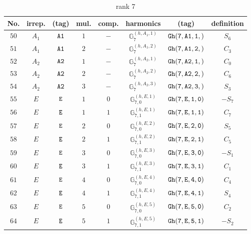 \documentclass[fleqn,8pt]{jsarticle}
\begin{document}
\begin{table}[ht!]
\begin{center}
\caption{rank 7}
\renewcommand{\arraystretch}{1.3}
\begin{tabular}{cccccccc} \hline \hline
No. & irrep. & (tag) & mul. & comp. & harmonics & (tag) & definition \\ \hline
$ 50 $ & $ A_{1} $ & $ {\tt A1} $ & $ 1 $ & $ - $ & $ \mathbb{G}_{7}^{(h,A_{1},1)} $ & $ {\tt Gh(7,A1,1,)} $ & $ S_{6} $ \\
$ 51 $ & $ A_{1} $ & $ {\tt A1} $ & $ 2 $ & $ - $ & $ \mathbb{G}_{7}^{(h,A_{1},2)} $ & $ {\tt Gh(7,A1,2,)} $ & $ C_{3} $ \\
$ 52 $ & $ A_{2} $ & $ {\tt A2} $ & $ 1 $ & $ - $ & $ \mathbb{G}_{7}^{(h,A_{2},1)} $ & $ {\tt Gh(7,A2,1,)} $ & $ C_{0} $ \\
$ 53 $ & $ A_{2} $ & $ {\tt A2} $ & $ 2 $ & $ - $ & $ \mathbb{G}_{7}^{(h,A_{2},2)} $ & $ {\tt Gh(7,A2,2,)} $ & $ C_{6} $ \\
$ 54 $ & $ A_{2} $ & $ {\tt A2} $ & $ 3 $ & $ - $ & $ \mathbb{G}_{7}^{(h,A_{2},3)} $ & $ {\tt Gh(7,A2,3,)} $ & $ S_{3} $ \\
$ 55 $ & $ E $ & $ {\tt E} $ & $ 1 $ & $ 0 $ & $ \mathbb{G}_{7,0}^{(h,E,1)} $ & $ {\tt Gh(7,E,1,0)} $ & $ - S_{7} $ \\
$ 56 $ & $ E $ & $ {\tt E} $ & $ 1 $ & $ 1 $ & $ \mathbb{G}_{7,1}^{(h,E,1)} $ & $ {\tt Gh(7,E,1,1)} $ & $ C_{7} $ \\
$ 57 $ & $ E $ & $ {\tt E} $ & $ 2 $ & $ 0 $ & $ \mathbb{G}_{7,0}^{(h,E,2)} $ & $ {\tt Gh(7,E,2,0)} $ & $ S_{5} $ \\
$ 58 $ & $ E $ & $ {\tt E} $ & $ 2 $ & $ 1 $ & $ \mathbb{G}_{7,1}^{(h,E,2)} $ & $ {\tt Gh(7,E,2,1)} $ & $ C_{5} $ \\
$ 59 $ & $ E $ & $ {\tt E} $ & $ 3 $ & $ 0 $ & $ \mathbb{G}_{7,0}^{(h,E,3)} $ & $ {\tt Gh(7,E,3,0)} $ & $ - S_{1} $ \\
$ 60 $ & $ E $ & $ {\tt E} $ & $ 3 $ & $ 1 $ & $ \mathbb{G}_{7,1}^{(h,E,3)} $ & $ {\tt Gh(7,E,3,1)} $ & $ C_{1} $ \\
$ 61 $ & $ E $ & $ {\tt E} $ & $ 4 $ & $ 0 $ & $ \mathbb{G}_{7,0}^{(h,E,4)} $ & $ {\tt Gh(7,E,4,0)} $ & $ C_{4} $ \\
$ 62 $ & $ E $ & $ {\tt E} $ & $ 4 $ & $ 1 $ & $ \mathbb{G}_{7,1}^{(h,E,4)} $ & $ {\tt Gh(7,E,4,1)} $ & $ S_{4} $ \\
$ 63 $ & $ E $ & $ {\tt E} $ & $ 5 $ & $ 0 $ & $ \mathbb{G}_{7,0}^{(h,E,5)} $ & $ {\tt Gh(7,E,5,0)} $ & $ C_{2} $ \\
$ 64 $ & $ E $ & $ {\tt E} $ & $ 5 $ & $ 1 $ & $ \mathbb{G}_{7,1}^{(h,E,5)} $ & $ {\tt Gh(7,E,5,1)} $ & $ - S_{2} $ \\
 \hline \hline
\end{tabular}
\end{center}
\end{table}
\end{document}
